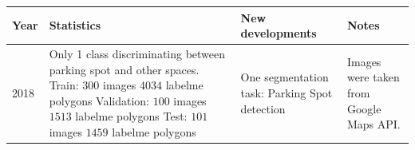 \documentclass[]{article}
\theoremstyle{definition}
\theoremstyle{definition}
\theoremstyle{definition}
\theoremstyle{remark}
\begin{document}
\begin{longtable}[]{@{}llll@{}}
\toprule
\begin{minipage}[b]{0.02\columnwidth}\raggedright
Year\strut
\end{minipage} & \begin{minipage}[b]{0.42\columnwidth}\raggedright
Statistics\strut
\end{minipage} & \begin{minipage}[b]{0.24\columnwidth}\raggedright
New developments\strut
\end{minipage} & \begin{minipage}[b]{0.20\columnwidth}\raggedright
Notes\strut
\end{minipage}\tabularnewline
\midrule
\endhead
\begin{minipage}[t]{0.02\columnwidth}\raggedright
2018\strut
\end{minipage} & \begin{minipage}[t]{0.42\columnwidth}\raggedright
Only 1 class discriminating between parking spot and other spaces.
\linebreak Train: \linebreak \hspace*{1cm} \(300\) images
\linebreak \hspace*{1cm} \(4034\) labelme polygons
\linebreak Validation: \linebreak \hspace*{1cm} \(100\) images
\linebreak \hspace*{1cm} \(1513\) labelme polygons \linebreak Test:
\linebreak \hspace*{1cm} \(101\) images \linebreak \hspace*{1cm}
\(1459\) labelme polygons\strut
\end{minipage} & \begin{minipage}[t]{0.24\columnwidth}\raggedright
One segmentation task: \linebreak Parking Spot detection\strut
\end{minipage} & \begin{minipage}[t]{0.20\columnwidth}\raggedright
Images were taken from \linebreak Google Maps API.\strut
\end{minipage}\tabularnewline
\bottomrule
\end{longtable}
\end{document}
